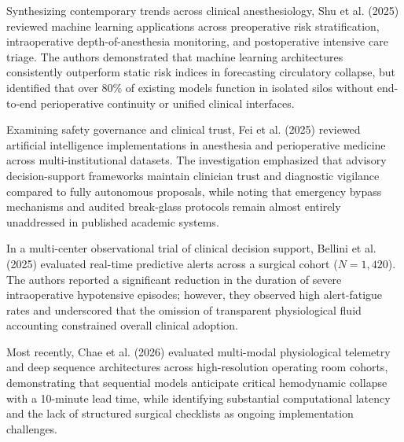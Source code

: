 \documentclass[conference]{IEEEtran}
\begin{document}
Synthesizing contemporary trends across clinical anesthesiology, Shu et al. (2025) reviewed machine learning applications across preoperative risk stratification, intraoperative depth-of-anesthesia monitoring, and postoperative intensive care triage. The authors demonstrated that machine learning architectures consistently outperform static risk indices in forecasting circulatory collapse, but identified that over 80\% of existing models function in isolated silos without end-to-end perioperative continuity or unified clinical interfaces.

Examining safety governance and clinical trust, Fei et al. (2025) reviewed artificial intelligence implementations in anesthesia and perioperative medicine across multi-institutional datasets. The investigation emphasized that advisory decision-support frameworks maintain clinician trust and diagnostic vigilance compared to fully autonomous proposals, while noting that emergency bypass mechanisms and audited break-glass protocols remain almost entirely unaddressed in published academic systems.

In a multi-center observational trial of clinical decision support, Bellini et al. (2025) evaluated real-time predictive alerts across a surgical cohort ($N=1,420$). The authors reported a significant reduction in the duration of severe intraoperative hypotensive episodes; however, they observed high alert-fatigue rates and underscored that the omission of transparent physiological fluid accounting constrained overall clinical adoption.

Most recently, Chae et al. (2026) evaluated multi-modal physiological telemetry and deep sequence architectures across high-resolution operating room cohorts, demonstrating that sequential models anticipate critical hemodynamic collapse with a 10-minute lead time, while identifying substantial computational latency and the lack of structured surgical checklists as ongoing implementation challenges.
\end{document}

